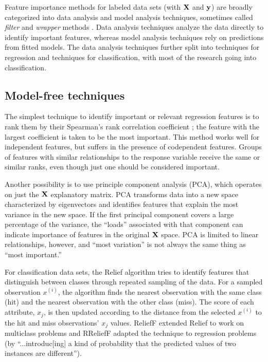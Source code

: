 \documentclass[11pt]{article}
\renewcommand{\xi}{x^{(i)}}
\begin{document}
Feature importance methods for labeled data sets (with $\bf X$ and $\bf y$) are broadly categorized into data analysis and model analysis techniques, sometimes called {\em filter} and {\em wrapper} methods \citep{tsanas}. Data analysis techniques analyze the data directly to identify important features, whereas model analysis techniques rely on predictions from fitted models.  The data analysis techniques further split into techniques for regression and techniques for classification, with most of the research going into classification.

\subsection{Model-free techniques}

The simplest technique to identify important or relevant regression features is to rank them by their Spearman's rank correlation coefficient \citep{spearmans}; the feature with the largest coefficient is taken to be the most important. This method works well for independent features, but suffers in the presence of codependent features.   Groups of features with similar relationships to the response variable receive the same or similar ranks, even though just one should be considered important.

Another possibility is to use principle component analysis (PCA), which operates on just the $\bf X$ explanatory matrix. PCA transforms data into a new space characterized by eigenvectors and identifies features that explain the most variance in the new space. If the first principal component covers a large percentage of the variance, the ``loads'' associated with that component can indicate importance of features in the original $\bf X$ space. PCA is limited to linear relationships, however, and ``most variation'' is not always the same thing as ``most important.''

For classification data sets, the Relief algorithm \citep{relief} tries to identify features that distinguish between classes through repeated sampling of the data. For a sampled observation $\xi$, the algorithm finds the nearest observation with the same class (hit) and the nearest observation with the other class (miss). The score of each attribute, $x_j$, is then updated according to the distance from the selected $\xi$ to the hit and miss observations'  $x_j$ values. ReliefF \citep{ReliefF} extended Relief to work on multiclass problems and RReliefF \citep{RReliefF} adapted the technique to regression problems (by ``...introduc[ing] a kind of probability that the predicted values of two instances are different'').
\end{document}
